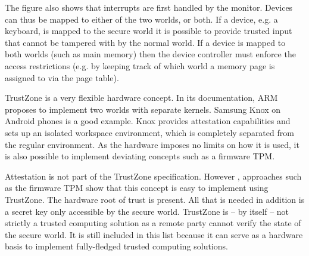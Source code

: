 \begin{description}
The figure also shows that interrupts are first handled by the monitor. Devices can thus be mapped to either of the two worlds, or both. If a device, e.g. a keyboard, is mapped to the secure world it is possible to provide trusted input that cannot be tampered with by the normal world. If a device is mapped to both worlds (such as main memory) then the device controller must enforce the access restrictions (e.g. by keeping track of which world a memory page is assigned to via the page table).\label{ID_139905209}

TrustZone is a very flexible hardware concept. In its documentation, ARM proposes to implement two worlds with separate kernels.\label{ID_1914471494}
Samsung Knox on Android phones is a good example. Knox provides attestation capabilities and sets up an isolated workspace environment, which is completely separated from the regular environment.\cite[]{knox}\label{ID_251460704}
As the hardware imposes no limits on how it is used, it is also possible to implement deviating concepts such as a firmware TPM.\cite[]{Raj2015}\label{ID_126730563}

Attestation is not part of the TrustZone specification. However , approaches such as the firmware TPM show that this concept is easy to implement using TrustZone. The hardware root of trust is present. All that is needed in addition is a secret key only accessible by the secure world.\label{ID_1549018417}
TrustZone is -- by itself -- not strictly a trusted computing solution as a remote party cannot verify the state of the secure world. It is still included in this list because it can serve as a hardware basis to implement fully-fledged trusted computing solutions.\label{ID_725637120}


\end{description}
